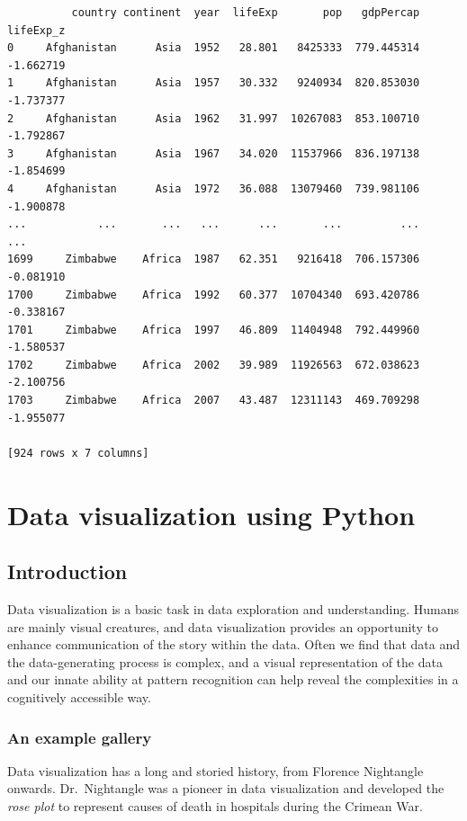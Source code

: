 \documentclass[
  letterpaper,
]{scrbook}
\begin{document}
\begin{verbatim}
          country continent  year  lifeExp       pop   gdpPercap  lifeExp_z
0     Afghanistan      Asia  1952   28.801   8425333  779.445314  -1.662719
1     Afghanistan      Asia  1957   30.332   9240934  820.853030  -1.737377
2     Afghanistan      Asia  1962   31.997  10267083  853.100710  -1.792867
3     Afghanistan      Asia  1967   34.020  11537966  836.197138  -1.854699
4     Afghanistan      Asia  1972   36.088  13079460  739.981106  -1.900878
...           ...       ...   ...      ...       ...         ...        ...
1699     Zimbabwe    Africa  1987   62.351   9216418  706.157306  -0.081910
1700     Zimbabwe    Africa  1992   60.377  10704340  693.420786  -0.338167
1701     Zimbabwe    Africa  1997   46.809  11404948  792.449960  -1.580537
1702     Zimbabwe    Africa  2002   39.989  11926563  672.038623  -2.100756
1703     Zimbabwe    Africa  2007   43.487  12311143  469.709298  -1.955077

[924 rows x 7 columns]
\end{verbatim}

\hypertarget{data-visualization-using-python}{%
\chapter{Data visualization using Python}\label{data-visualization-using-python}}

\hypertarget{introduction-2}{%
\section{Introduction}\label{introduction-2}}

Data visualization is a basic task in data exploration and understanding. Humans are mainly visual creatures, and data visualization provides an opportunity to enhance communication of the story within the data. Often we find that data and the data-generating process is complex, and a visual representation of the data and our innate ability at pattern recognition can help reveal the complexities in a cognitively accessible way.

\hypertarget{an-example-gallery}{%
\subsection{An example gallery}\label{an-example-gallery}}

Data visualization has a long and storied history, from Florence Nightangle onwards. Dr.~Nightangle was a pioneer in data visualization and developed the \emph{rose plot} to represent causes of death in hospitals during the Crimean War.
\end{document}
